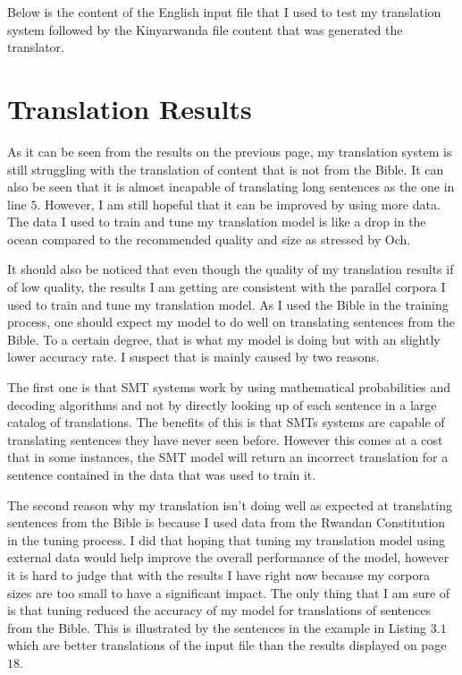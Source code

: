 Below is the content of the English input file that I used to test my translation system followed by the Kinyarwanda file content that was generated the translator. \newline




\clearpage
\section{Translation Results}
As it can be seen from the results on the previous page, my translation system is still struggling with the translation of content that is not from the Bible. It can also be seen that it is almost incapable of translating long sentences as the one in line $5$. However, I am still hopeful that it can be improved by using more data. The data I used to train and tune  my translation model is like a drop in the ocean compared to the recommended quality and size as stressed by Och\cite{och2005statistical}.

It should also be noticed that even though the quality of my translation results if of low quality, the results I am getting are consistent with the parallel corpora I used to train and tune my translation model. As I used the Bible in the training process, one should expect my model to do well on translating sentences from the Bible. To a certain degree, that is what my model is doing but with an slightly lower accuracy rate. I suspect that is mainly caused by two reasons. 

The first one is that SMT systems work by using mathematical probabilities and decoding algorithms and not by directly looking up of each sentence in a large catalog of translations. The benefits of this is that SMTs systems are capable of translating sentences they have never seen before. However this comes at a cost that in some instances, the SMT model will return an incorrect translation for a sentence contained in the data that was used to train it.




The second reason why my translation isn't doing well as expected at translating sentences from the Bible is because I used data from the Rwandan Constitution in the tuning process. I did that hoping that tuning my translation model using external data would help improve the overall performance of the model, however it is hard to judge that with the results I have right now because my corpora sizes are too small to have a significant impact. The only thing that I am sure of is that tuning reduced the accuracy of my model for translations of sentences from the Bible. This is illustrated by the sentences in the example in Listing $3.1$ which are better translations of the input file than the results displayed on page $18$.


